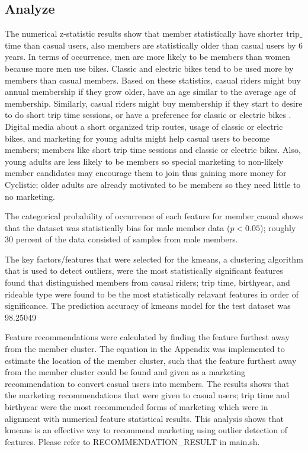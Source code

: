 \documentclass[11pt, onecolumn]{article}
\begin{document}
\subsection{Analyze}
The numerical z-statistic results show that member statistically have shorter trip$\_$time than casual users, also members are statistically older than casual users by 6 years. In terms of occurrence, men are more likely to be members than women because more men use bikes. Classic and electric bikes tend to be used more by members than casual members. Based on these statistics, casual riders might buy annual membership if they grow older, have an age similar to the average age of membership. Similarly, casual riders might buy membership if they start to desire to do short trip time sessions, or have a preference for classic or electric bikes . Digital media about a short organized trip routes, usage of classic or electric bikes, and marketing for young adults might help casual users to become members; members like short trip time sessions and classic or electric bikes. Also, young adults are less likely to be members so special marketing to non-likely member candidates may encourage them to join thus gaining more money for Cyclistic; older adults are already motivated to be members so they need little to no marketing.

The categorical probability of occurrence of each feature for member$\_$casual shows that the dataset was statistically bias for male member data ($p < 0.05$); roughly 30 percent of the data consisted of samples from male members. 

The key factors/features that were selected for the kmeans, a  clustering algorithm that is used to detect outliers, were the most statistically significant features found that distinguished members from causal riders; trip time, birthyear, and rideable type were found to be the most statistically relavant features in order of significance. The prediction accuracy of kmeans model for the test dataset was 98.25049%

Feature recommendations were calculated by finding the feature furthest away from the member cluster. The equation in the Appendix was implemented to estimate the location of the member cluster, such that the feature furthest away from the member cluster could be found and given as a marketing recommendation to convert casual users into members. The results shows that the marketing recommendations that were given to casual users; trip time and birthyear were the most recommended forms of marketing which were in alignment with numerical feature statistical results. This analysis shows that kmeans is an effective way to recommend marketing using outlier detection of features. Please refer to RECOMMENDATION_RESULT in main.sh.
\end{document}
